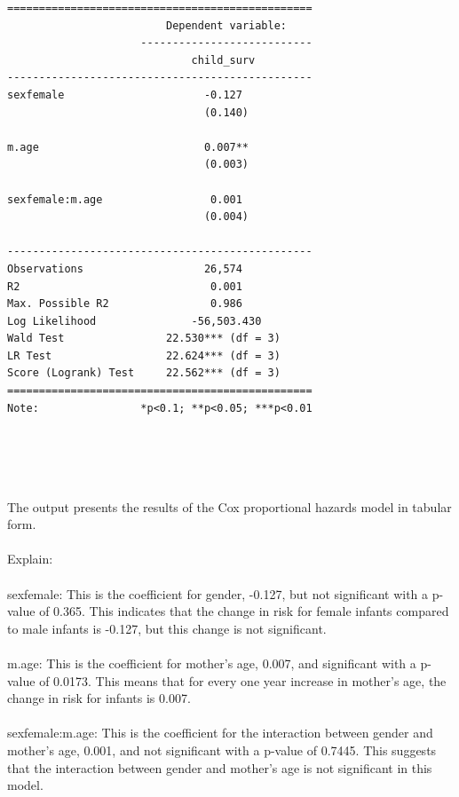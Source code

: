 \documentclass[12pt,letterpaper]{article}
\begin{document}

\begin{verbatim}
================================================
                         Dependent variable:    
                     ---------------------------
                             child_surv         
------------------------------------------------
sexfemale                      -0.127           
                               (0.140)          
                                                
m.age                          0.007**          
                               (0.003)          
                                                
sexfemale:m.age                 0.001           
                               (0.004)          
                                                
------------------------------------------------
Observations                   26,574           
R2                              0.001           
Max. Possible R2                0.986           
Log Likelihood               -56,503.430        
Wald Test                22.530*** (df = 3)     
LR Test                  22.624*** (df = 3)     
Score (Logrank) Test     22.562*** (df = 3)     
================================================
Note:                *p<0.1; **p<0.05; ***p<0.01
\end{verbatim}
\\\\\\\\
The output presents the results of the Cox proportional hazards model in tabular form. \\\\
Explain:\\\\
sexfemale: This is the coefficient for gender, -0.127, but not significant with a p-value of 0.365. This indicates that the change in risk for female infants compared to male infants is -0.127, but this change is not significant.\\\\
m.age: This is the coefficient for mother's age, 0.007, and significant with a p-value of 0.0173. This means that for every one year increase in mother's age, the change in risk for infants is 0.007.\\\\
sexfemale:m.age: This is the coefficient for the interaction between gender and mother's age, 0.001, and not significant with a p-value of 0.7445. This suggests that the interaction between gender and mother's age is not significant in this model.\\\\
\end{document}
